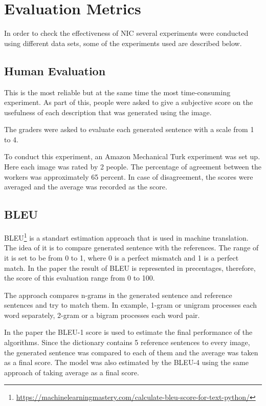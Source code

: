 \documentclass[a4paper,UKenglish,cleveref, autoref, thm-restate]{lipics-v2021}
\begin{document}
\section{Evaluation Metrics}
In order to check the effectiveness of NIC several experiments were conducted using different data sets, some of the experiments used are described below.

\label{Evaluation metrics}
\subsection{Human Evaluation}
This is the most reliable but at the same time the most time-consuming experiment. As part of this, people were asked to give a subjective score on the usefulness of each description that was generated using the image.

The graders were asked to evaluate each generated sentence with a scale from 1 to 4.

To conduct this experiment, an Amazon Mechanical Turk experiment was set up. Here each image was rated by 2 people. The percentage of agreement between the workers was approximately 65 percent. In case of disagreement, the scores were averaged and the average was recorded as the score.

\subsection{BLEU}
BLEU\footnote{\url{ https://machinelearningmastery.com/calculate-bleu-score-for-text-python/}} is a standart estimation approach that is used in machine translation. The idea of it is to compare generated sentence with the references. The range of it is set to be from 0 to 1, where 0 is a perfect mismatch and 1 is a perfect match. In the paper the result of BLEU is represented in precentages, therefore, the score of this evaluation range from 0 to 100.

The approach compares n-grams in the generated sentence and reference sentences and try to match them. In example, 1-gram or unigram processes each word separately, 2-gram or a bigram processes each word pair.

In the paper the BLEU-1 score is used to estimate the final performance of the algorithms. Since the dictionary contains 5 reference sentences to every image, the generated sentence was compared to each of them and the average was taken as a final score. The model was also estimated by the BLEU-4 using the same approach of taking average as a final score.
\end{document}

